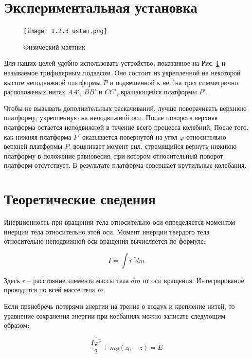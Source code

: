 	\section {Экспериментальная установка}
	
	\begin{figure}
		\texttt{[image: 1.2.3 ustan.png]}
		\caption{Физический маятник}\label{risunok}
	\end{figure}
	
	Для наших целей удобно использовать устройство, показанное на Рис. \ref{risunok} и называемое трифилярным подвесом. Оно состоит из укрепленной на некоторой высоте неподвижной платформы $P$ и подвешенной к ней на трех симметрично расположеных нитях $AA'$, $BB'$ и $CC'$, вращающейся платформы $P'$. 
	
	Чтобы не вызывать дополнительных раскачиваний, лучше поворачивать верхнюю платформу, укрепленную на неподвижной оси. После поворота верхняя платформа остается неподвижной в течение всего процесса колебний. После того, как нижняя платформа $P'$ оказывается повернутой на угол $\varphi$ относительно верхней платформы $P$, вощникает момент сил, стремящийся вернуть нижнюю платформу в положение равновесия, при котором относительный поворот платформ отсутствует. В результате платформа совершает крутильные колебания.
	
	\section{Теоретические сведения}
	
	\par Инерционность при вращении тела относительно оси определяется моментом инерции тела относительно этой оси. Момент инерции твердого тела относительно неподвижной оси вращения вычисляется по формуле:
	
	\begin{equation}
		I = \int r^2 dm
	\end{equation}
	
	Здесь $r$ -- расстояние элемента массы тела $dm$ от оси вращения. Интегрирование проводится по всей массе тела $m$.
	
	Если пренебречь потерями энергии на трение о воздух и крепление нитей, то уравнение сохранения энергии при коебаниях можно записать следующим образом:
	
	\begin{equation}\label{moment}
		\frac{I \dot{\varphi^2}}{2} + mg(z_0-z) = E
	\end{equation}
	
